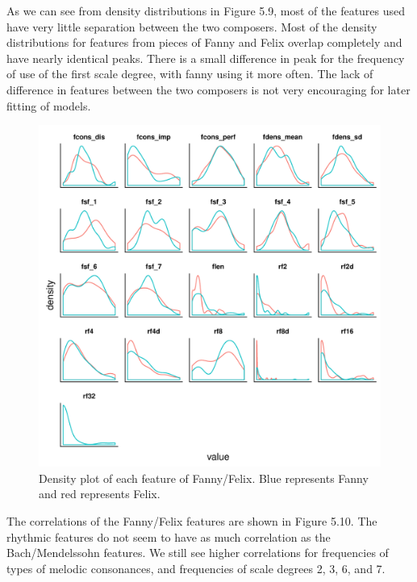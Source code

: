 \documentclass[12pt,twoside]{reedthesis}
\theoremstyle{definition}
\theoremstyle{definition}
\theoremstyle{definition}
\theoremstyle{remark}
\begin{document}
As we can see from density distributions in Figure 5.9, most of the
features used have very little separation between the two composers.
Most of the density distributions for features from pieces of Fanny and
Felix overlap completely and have nearly identical peaks. There is a
small difference in peak for the frequency of use of the first scale
degree, with fanny using it more often. The lack of difference in
features between the two composers is not very encouraging for later
fitting of models.
\begin{figure}[H]
\centering
\includegraphics[scale = .7]{images/distribution_f.pdf}
\caption{Density plot of each feature of Fanny/Felix. Blue represents Fanny and red represents Felix.}
\label{subd}
\end{figure}
The correlations of the Fanny/Felix features are shown in Figure 5.10.
The rhythmic features do not seem to have as much correlation as the
Bach/Mendelssohn features. We still see higher correlations for
frequencies of types of melodic consonances, and frequencies of scale
degrees 2, 3, 6, and 7.
\end{document}
